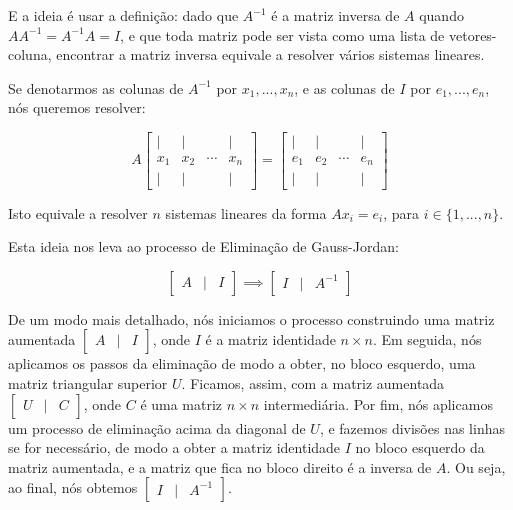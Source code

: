 E a ideia é usar a definição: dado que $A^{-1}$ é a matriz inversa de $A$ quando $AA^{-1} = A^{-1}A = I$, e que toda matriz pode ser vista como uma lista de vetores-coluna, encontrar a matriz inversa equivale a resolver vários sistemas lineares.

Se denotarmos as colunas de $A^{-1}$ por $x_1, ..., x_n$, e as colunas de $I$ por $e_1, ..., e_n$, nós queremos resolver:

$$
A\begin{bmatrix}
	| & | & & | \\
	x_1 & x_2 & \cdots & x_n \\
	| & | & & |
\end{bmatrix} = \begin{bmatrix}
    | & | & &  | \\
    e_1 & e_2 & \cdots & e_n \\
    | & | & & |
\end{bmatrix}
$$

Isto equivale a resolver $n$ sistemas lineares da forma $Ax_i = e_i$, para $i\in\{1, ..., n\}$.

Esta ideia nos leva ao processo de Eliminação de Gauss-Jordan: 

$$
\begin{bmatrix}
	A & | & I
\end{bmatrix} \implies \begin{bmatrix}
	I & | & A^{-1}
\end{bmatrix}
$$

De um modo mais detalhado, nós iniciamos o processo construindo uma matriz aumentada $\begin{bmatrix}
	A & | & I
\end{bmatrix}$, onde $I$ é a matriz identidade $n\times n$. Em seguida, nós aplicamos os passos da eliminação de modo a obter, no bloco esquerdo, uma matriz triangular superior $U$. Ficamos, assim, com a matriz aumentada $\begin{bmatrix}
	U & | & C
\end{bmatrix}$, onde $C$ é uma matriz $n\times n$ intermediária. Por fim, nós aplicamos um processo de eliminação acima da diagonal de $U$, e fazemos divisões nas linhas se for necessário, de modo a obter a matriz identidade $I$ no bloco esquerdo da matriz aumentada, e a matriz que fica no bloco direito é a inversa de $A$. Ou seja, ao final, nós obtemos $\begin{bmatrix}
	I & | & A^{-1}
\end{bmatrix}$.

